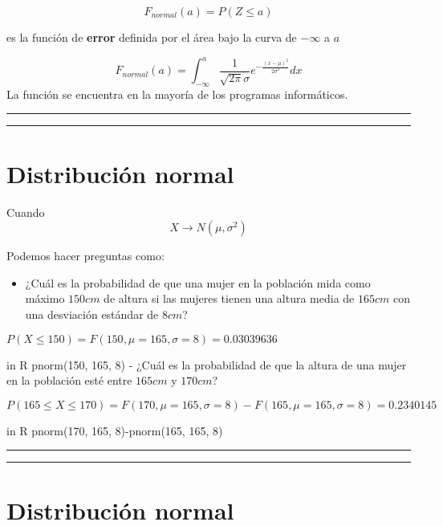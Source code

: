 \documentclass[
]{book}
\providecommand{\tightlist}{%
  \setlength{\itemsep}{0pt}\setlength{\parskip}{0pt}}
\begin{document}
\[F_{normal}(a)=P(Z \leq a)\]

es la función de \textbf{error} definida por el área bajo la curva de \(-\infty\) a \(a\)

\[F_{normal}(a)=\int_{-\infty}^{a}\frac{1}{\sqrt{2\pi}\sigma}e^{-\frac{(x-\mu) ^2}{2\sigma^2}} dx\]
La función se encuentra en la mayoría de los programas informáticos.

\begin{center}\rule{0.5\linewidth}{0.5pt}\end{center}

\begin{center}\rule{0.5\linewidth}{0.5pt}\end{center}

\hypertarget{distribuciuxf3n-normal-2}{%
\section{Distribución normal}\label{distribuciuxf3n-normal-2}}

Cuando \[X \rightarrow N(\mu, \sigma^2)\]

Podemos hacer preguntas como:

\begin{itemize}
\tightlist
\item
  ¿Cuál es la probabilidad de que una mujer en la población mida como máximo \(150 cm\) de altura si las mujeres tienen una altura media de \(165 cm\) con una desviación estándar de \(8 cm\)?
\end{itemize}

\(P(X\le 150)=F(150, \mu=165, \sigma=8)=0.03039636\)

in R pnorm(150, 165, 8)
- ¿Cuál es la probabilidad de que la altura de una mujer en la población esté entre \(165cm\) y \(170cm\)?

\(P(165 \le X \le 170)=F(170, \mu=165, \sigma=8)-F(165, \mu=165, \sigma=8)=0.2340145\)

in R pnorm(170, 165, 8)-pnorm(165, 165, 8)

\begin{center}\rule{0.5\linewidth}{0.5pt}\end{center}

\begin{center}\rule{0.5\linewidth}{0.5pt}\end{center}

\hypertarget{distribuciuxf3n-normal-3}{%
\section{Distribución normal}\label{distribuciuxf3n-normal-3}}
\end{document}
